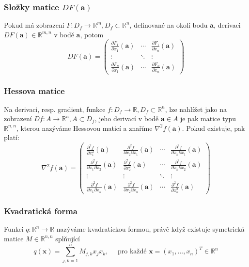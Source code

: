 \subsubsection*{Složky matice $DF(\textbf{a})$}
Pokud má zobrazení $F: D_f \rightarrow \mathbb{R}^m, D_f \subset \mathbb{R}^n$, definované na okolí bodu $\textbf{a}$, derivaci $DF(\textbf{a}) \in \mathbb{R}^{m,n}$ v bodě $\textbf{a}$, potom $$DF(\textbf{a}) = \begin{pmatrix} 
\frac{\partial F_1}{\partial x_1}(\textbf{a}) & \cdots & \frac{\partial F_1}{\partial x_n}(\textbf{a})\\
\vdots & \ddots & \vdots \\
\frac{\partial F_n}{\partial x_1}(\textbf{a}) & \cdots & \frac{\partial F_n}{\partial x_n}(\textbf{a}) 
\end{pmatrix}$$

\subsubsection*{Hessova matice}
Na derivaci, resp. gradient, funkce $f: D_f \rightarrow \mathbb{R}, D_f \subset \mathbb{R}^n$, lze nahlížet jako na zobrazení $Df: A \rightarrow \mathbb{R}^n, A \subset	D_f$, jeho derivací v bodě $\textbf{a} \in A$ je pak matice typu $\mathbb{R}^{n,n}$, kterou nazýváme Hessovou maticí a znaříme $\nabla^2 f(\textbf{a})$. Pokud existuje, pak platí:
$$\nabla^2 f(\textbf{a}) = \begin{pmatrix} 
\frac{\partial^2 f}{\partial x_1^2}(\textbf{a}) & \frac{\partial^2 f}{\partial x_2 \partial x_1}(\textbf{a}) & \cdots & \frac{\partial^2 f}{\partial x_n \partial x_1}(\textbf{a})\\
\frac{\partial^2 f}{\partial x_1 \partial x_2}(\textbf{a}) & \frac{\partial^2 f}{\partial x_2^2}(\textbf{a}) & \cdots & \frac{\partial^2 f}{\partial x_n \partial x_2}(\textbf{a}) \\
\vdots & \vdots & \ddots & \vdots \\
\frac{\partial^2 f}{\partial x_1 \partial x_n}(\textbf{a}) & \frac{\partial^2 f}{\partial x_2 \partial x_n}(\textbf{a}) & \cdots & \frac{\partial^2 f}{\partial x_n^2}(\textbf{a}) 
\end{pmatrix}$$

\subsubsection*{Kvadratická forma}
Funkci $q: \mathbb{R}^n \rightarrow \mathbb{R}$ nazýváme kvadratickou formou, právě když existuje symetrická matice $M \in \mathbb{R}^{n,n}$ splňující $$q(\textbf{x}) = \sum_{j,k=1}^n M_{j,k}x_j x_k, \quad \text{ pro každé } \textbf{x} = (x_1,...,x_n)^T \in \mathbb{R}^n$$

